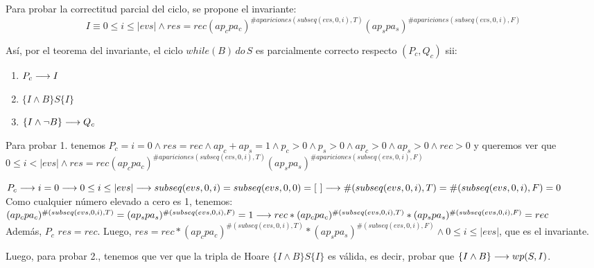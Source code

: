 \documentclass[10pt,a4paper]{article}
\begin{document}
Para probar la correctitud parcial del ciclo, se propone el invariante:
\begin{equation*}
	I \equiv 0 \leq i \leq |evs| \wedge res = rec (ap_c pa_c)^{\# apariciones(subseq(evs, 0, i), T)}(ap_s pa_s)^{\#apariciones(subseq(evs, 0, i), F)}
\end{equation*}	

Así, por el teorema del invariante, el ciclo $while(B) \, do \, S$ es parcialmente correcto respecto $(P_c, Q_c) $ sii:

\begin{enumerate} \setlength\itemsep{0cm}
	\item $P_c \longrightarrow I$
	\item $\{I \wedge B \} S \{I\}$
	\item $\{I \wedge \neg B \} \longrightarrow Q_c$
\end{enumerate}

Para probar 1. tenemos $P_c = i=0 \wedge res=rec \wedge ap_c + ap_s = 1 \wedge p_c > 0 \wedge p_s > 0 \wedge ap_c > 0 \wedge ap_s > 0 \wedge rec > 0$ y queremos ver que \\ $0 \leq i < |evs| \wedge res = rec (ap_c pa_c)^{\# apariciones(subseq(evs, 0, i), T)}(ap_s pa_s)^{\#apariciones(subseq(evs, 0, i), F)}$

\begin{proof*}
    $P_c \longrightarrow  i = 0 \longrightarrow 0 \leq i \leq |evs| \\
    \longrightarrow subseq(evs, 0, i) = subseq(evs, 0, 0) = [\ ] \\
    \longrightarrow \#(subseq(evs, 0, i), T) = \#(subseq(evs, 0, i), F) = 0  $\\
    Como cualquier número elevado a cero es 1, tenemos: \\
    $(ap_c pa_c)^{\#(subseq(evs, 0, i), T)} = (ap_s pa_s)^{\#(subseq(evs, 0, i), F)} = 1 \\
	\longrightarrow rec * (ap_c pa_c)^{\#(subseq(evs, 0, i), T)} * (ap_s pa_s)^{\#(subseq(evs, 0, i), F)} = rec $\\
    Además, $P_c$ \implica $res = rec$. Luego, $res = rec * (ap_c pa_c)^{\#(subseq(evs, 0, i), T)} * (ap_s pa_s)^{\#(subseq(evs, 0, i), F)} \wedge 0 \leq i \leq |evs|$, que es el invariante.
\end{proof*}

Luego, para probar 2., tenemos que ver que la tripla de Hoare $\{I \wedge B \} S \{I\}$ es válida, es decir, probar que $\{I \wedge B \} \longrightarrow wp(S, I) $.\\
\end{document}
